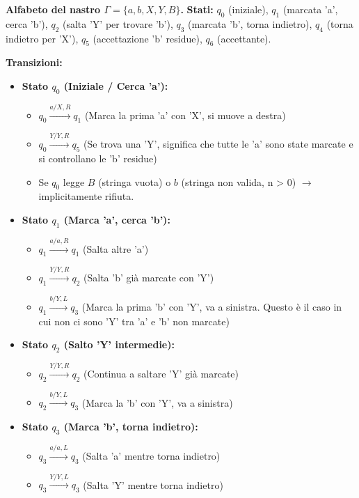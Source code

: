\documentclass[a4paper]{article}
\begin{document}
\noindent \textbf{Alfabeto del nastro $\Gamma = \{a, b, X, Y, B\}$.}
\noindent \textbf{Stati:} $q_0$ (iniziale), $q_1$ (marcata 'a', cerca 'b'), $q_2$ (salta 'Y' per trovare 'b'), $q_3$ (marcata 'b', torna indietro), $q_4$ (torna indietro per 'X'), $q_5$ (accettazione 'b' residue), $q_6$ (accettante).

\noindent \textbf{Transizioni:}
\begin{itemize}
    \item \textbf{Stato $q_0$ (Iniziale / Cerca 'a'):}
        \begin{itemize}
            \item $q_0 \xrightarrow{a / X, R} q_1$ (Marca la prima 'a' con 'X', si muove a destra)
            \item $q_0 \xrightarrow{Y / Y, R} q_5$ (Se trova una 'Y', significa che tutte le 'a' sono state marcate e si controllano le 'b' residue)
            \item Se $q_0$ legge $B$ (stringa vuota) o $b$ (stringa non valida, n > 0) $\to$ implicitamente rifiuta.
        \end{itemize}
    \item \textbf{Stato $q_1$ (Marca 'a', cerca 'b'):}
        \begin{itemize}
            \item $q_1 \xrightarrow{a / a, R} q_1$ (Salta altre 'a')
            \item $q_1 \xrightarrow{Y / Y, R} q_2$ (Salta 'b' già marcate con 'Y')
            \item $q_1 \xrightarrow{b / Y, L} q_3$ (Marca la prima 'b' con 'Y', va a sinistra. Questo è il caso in cui non ci sono 'Y' tra 'a' e 'b' non marcate)
        \end{itemize}
    \item \textbf{Stato $q_2$ (Salto 'Y' intermedie):}
        \begin{itemize}
            \item $q_2 \xrightarrow{Y / Y, R} q_2$ (Continua a saltare 'Y' già marcate)
            \item $q_2 \xrightarrow{b / Y, L} q_3$ (Marca la 'b' con 'Y', va a sinistra)
        \end{itemize}
    \item \textbf{Stato $q_3$ (Marca 'b', torna indietro):}
        \begin{itemize}
            \item $q_3 \xrightarrow{a / a, L} q_3$ (Salta 'a' mentre torna indietro)
            \item $q_3 \xrightarrow{Y / Y, L} q_3$ (Salta 'Y' mentre torna indietro)

\end{itemize}
\end{itemize}
\end{document}
